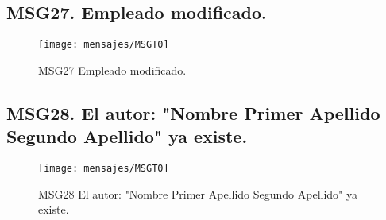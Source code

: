 \subsection{MSG27. Empleado modificado.}
    \begin{figure}[htbp]
        \begin{center}
            \texttt{[image: mensajes/MSGT0]}
            \caption{MSG27 Empleado modificado.}
            \label{fig:MSG27}
        \end{center}
    \end{figure}
    
\subsection{MSG28. El autor: "Nombre Primer Apellido Segundo Apellido" ya existe.}
    \begin{figure}[htbp]
        \begin{center}
            \texttt{[image: mensajes/MSGT0]}
            \caption{MSG28 El autor: "Nombre Primer Apellido Segundo Apellido" ya existe.}
            \label{fig:MSG28}
        \end{center}
    \end{figure}    
    
    

